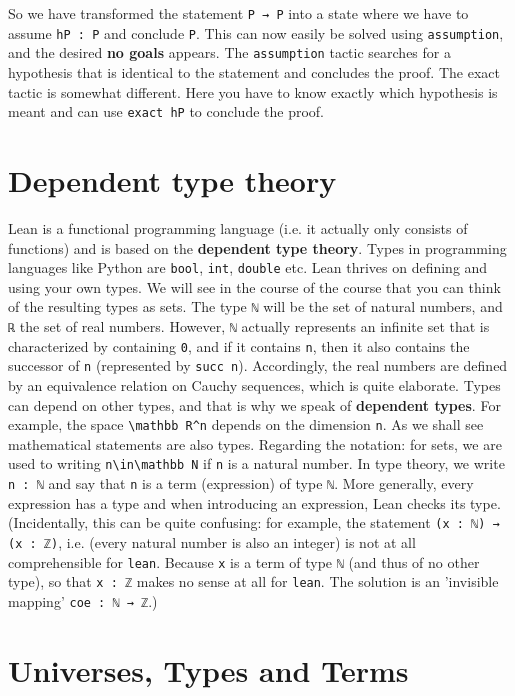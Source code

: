 \documentclass{memoir}
\begin{document}
So we have transformed the statement \Verb|P → P| into a state where we have to assume \Verb|hP : P| and conclude \Verb|P|. This can now easily be solved using \Verb|assumption|, and the desired \textbf{no goals} appears. The \Verb|assumption| tactic searches for a hypothesis that is identical to the statement and concludes the proof. The exact  tactic is somewhat different. Here you have to know exactly which hypothesis is meant and can use \Verb|exact hP| to conclude the proof.



\section{Dependent type theory}

Lean is a functional programming language (i.e. it actually only consists of functions) and is based on the \textbf{dependent type theory}. Types in programming languages like Python are \Verb|bool|, \Verb|int|, \Verb|double| etc. Lean thrives on defining and using your own types. We will see in the course of the course that you can think of the resulting types as sets. The type \Verb|ℕ| will be the set of natural numbers, and \Verb|ℝ| the set of real numbers. However, \Verb|ℕ| actually represents an infinite set that is characterized by containing \Verb|0|, and if it contains \Verb|n|, then it also contains the successor of \Verb|n| (represented by \Verb|succ n|). Accordingly, the real numbers are defined by an equivalence relation on Cauchy sequences,  which is quite elaborate. Types can depend on other types, and that is why we speak of \textbf{dependent types}. For example, the space \Verb|\mathbb R^n| depends on the dimension \Verb|n|. As we shall see mathematical statements are also types. Regarding the notation: for sets, we are used to writing \Verb|n\in\mathbb N| if \Verb|n| is a natural number. In type theory, we write \Verb|n : ℕ| and say that \Verb|n| is a term (expression) of type \Verb|ℕ|. More generally, every expression has a type and when introducing an expression, Lean checks its type. (Incidentally, this can be quite confusing: for example, the statement \Verb|(x : ℕ) → (x : ℤ)|, i.e. (every natural number is also an integer) is not at all comprehensible for \Verb|lean|. Because \Verb|x| is a term of type \Verb|ℕ| (and thus of no other type), so that \Verb|x : ℤ| makes no sense at all for \Verb|lean|. The solution is an 'invisible mapping' \Verb|coe : ℕ → ℤ|.)



\section{Universes, Types and Terms}
\end{document}

